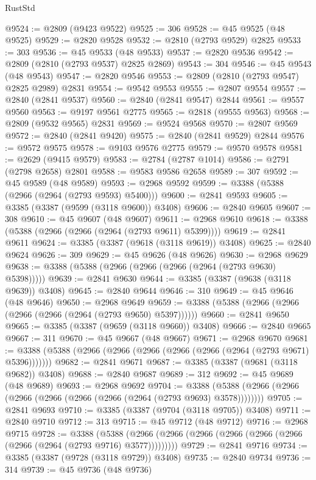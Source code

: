 \begin{lexlean}{RustStd}
\begin{coremodule}
{\begin{coremodule}
{{{{{{{{{{{{{{{{{{{{{{{{{{{{{{{{{@9524 := @2809 (@9423 @9522)
@9525 := 306
@9528 := @45 @9525 (@48 @9525)
@9529 := @2820 @9528
@9532 := @2810 (@2793 @9529) @2825
@9533 := 303
@9536 := @45 @9533 (@48 @9533)
@9537 := @2820 @9536
@9542 := @2809 (@2810 (@2793 @9537) @2825 @2869)
@9543 := 304
@9546 := @45 @9543 (@48 @9543)
@9547 := @2820 @9546
@9553 := @2809 (@2810 (@2793 @9547) @2825 @2989) @2831
@9554 := @9542 @9553
@9555 := @2807 @9554
@9557 := @2840 (@2841 @9537)
@9560 := @2840 (@2841 @9547) @2844
@9561 := @9557 @9560
@9563 := @9197 @9561 @2775
@9565 := @2818 (@9555 @9563)
@9568 := @2809 (@9532 @9565) @2831
@9569 := @9524 @9568
@9570 := @2807 @9569
@9572 := @2840 (@2841 @9420)
@9575 := @2840 (@2841 @9529) @2844
@9576 := @9572 @9575
@9578 := @9103 @9576 @2775
@9579 := @9570 @9578
@9581 := @2629 (@9415 @9579)
@9583 := @2784 (@2787 @1014)
@9586 := @2791 (@2798 @2658) @2801
@9588 := @9583 @9586 @2658
@9589 := 307
@9592 := @45 @9589 (@48 @9589)
@9593 := @2968 @9592
@9599 := @3388 (@5388 (@2966 (@2964 (@2793 @9593) @5400)))
@9600 := @2841 @9593
@9605 := @3385 (@3387 (@9599 (@3118 @9600)) @3408)
@9606 := @2840 @9605
@9607 := 308
@9610 := @45 @9607 (@48 @9607)
@9611 := @2968 @9610
@9618 := @3388 (@5388 (@2966 (@2966 (@2964 (@2793 @9611) @5399))))
@9619 := @2841 @9611
@9624 := @3385 (@3387 (@9618 (@3118 @9619)) @3408)
@9625 := @2840 @9624
@9626 := 309
@9629 := @45 @9626 (@48 @9626)
@9630 := @2968 @9629
@9638 := @3388 (@5388 (@2966 (@2966 (@2966 (@2964 (@2793 @9630) @5398)))))
@9639 := @2841 @9630
@9644 := @3385 (@3387 (@9638 (@3118 @9639)) @3408)
@9645 := @2840 @9644
@9646 := 310
@9649 := @45 @9646 (@48 @9646)
@9650 := @2968 @9649
@9659 := @3388 (@5388 (@2966 (@2966 (@2966 (@2966 (@2964 (@2793 @9650) @5397))))))
@9660 := @2841 @9650
@9665 := @3385 (@3387 (@9659 (@3118 @9660)) @3408)
@9666 := @2840 @9665
@9667 := 311
@9670 := @45 @9667 (@48 @9667)
@9671 := @2968 @9670
@9681 := @3388 (@5388 (@2966 (@2966 (@2966 (@2966 (@2966 (@2964 (@2793 @9671) @5396)))))))
@9682 := @2841 @9671
@9687 := @3385 (@3387 (@9681 (@3118 @9682)) @3408)
@9688 := @2840 @9687
@9689 := 312
@9692 := @45 @9689 (@48 @9689)
@9693 := @2968 @9692
@9704 := @3388 (@5388 (@2966 (@2966 (@2966 (@2966 (@2966 (@2966 (@2964 (@2793 @9693) @3578))))))))
@9705 := @2841 @9693
@9710 := @3385 (@3387 (@9704 (@3118 @9705)) @3408)
@9711 := @2840 @9710
@9712 := 313
@9715 := @45 @9712 (@48 @9712)
@9716 := @2968 @9715
@9728 := @3388
    (@5388 (@2966 (@2966 (@2966 (@2966 (@2966 (@2966 (@2966 (@2964 (@2793 @9716) @3577)))))))))
@9729 := @2841 @9716
@9734 := @3385 (@3387 (@9728 (@3118 @9729)) @3408)
@9735 := @2840 @9734
@9736 := 314
@9739 := @45 @9736 (@48 @9736)
}}}}}}}}}}}}}}}}}}}}}}}}}}}}}}}}}
\end{coremodule}}
\end{coremodule}
\end{lexlean}
